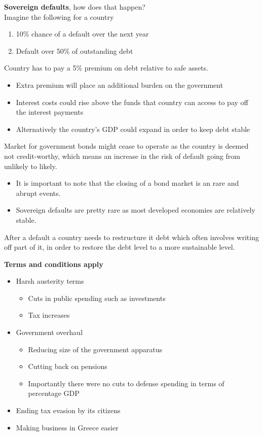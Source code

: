 \documentclass{beamer}
\begin{document}
\begin{frame}
  \textbf{Sovereign defaults}, how does that happen?\\
  Imagine the following for a country
  \begin{enumerate}
    \item 10\% chance of a default over the next year
    \item Default over 50\% of outstanding debt
  \end{enumerate}
 Country has to pay a 5\% premium on debt relative to safe assets.
 \begin{itemize}
   \item Extra premium will place an additional burden on the government
   \item Interest costs could rise above the funds that country can access to pay off the interest payments
   \item  Alternatively the country's GDP could expand in order to keep debt stable
 \end{itemize}
Market for government bonds might cease to operate as the country is deemed not credit-worthy, which means an increase in the risk of default going from unlikely to likely. 
\begin{itemize}
  \item It is important to note that the closing of a bond market is an rare and abrupt events. 
  \item Sovereign defaults are pretty rare as most developed economies are relatively stable. 
\end{itemize}
After a default a country needs to restructure it debt which often involves writing off part of it, in order to restore the debt level to a more sustainable level.
\end{frame}

\begin{frame}
  \textbf{Terms and conditions apply}
  \begin{itemize}
    \item Harsh austerity terms 
  \begin{itemize}
    \item Cuts in public spending such as investments 
    \item Tax increases    
  \end{itemize}
  \item Government overhaul
  \begin{itemize}
    \item Reducing size of the government apparatus
    \item Cutting back on pensions
    \item Importantly there were no cuts to defense spending in terms of percentage GDP    
  \end{itemize}
  \item Ending tax evasion by its citizens
  \item Making business in Greece easier  
  \end{itemize}
\end{frame}
\end{document}
